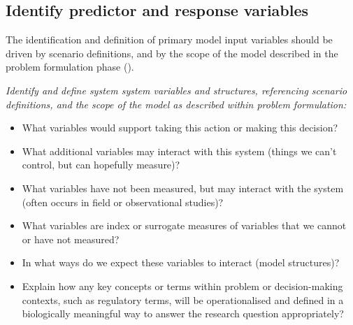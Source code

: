 \documentclass[
]{article}
\providecommand{\tightlist}{%
  \setlength{\itemsep}{0pt}\setlength{\parskip}{0pt}}
\begin{document}
\subsection{Identify predictor and response
variables}\label{identify-predictor-and-response-variables}

\begin{tcolorbox}[enhanced jigsaw, opacitybacktitle=0.6, bottomrule=.15mm, leftrule=.75mm, rightrule=.15mm, colbacktitle=quarto-callout-note-color!10!white, toprule=.15mm, titlerule=0mm, left=2mm, colframe=quarto-callout-note-color-frame, breakable, title=\textcolor{quarto-callout-note-color}{\faInfo}\hspace{0.5em}{Explanation}, opacityback=0, coltitle=black, bottomtitle=1mm, colback=white, toptitle=1mm, arc=.35mm]

The identification and definition of primary model input variables
should be driven by scenario definitions, and by the scope of the model
described in the problem formulation phase
().

\end{tcolorbox}

\begin{tcolorbox}[enhanced jigsaw, opacitybacktitle=0.6, bottomrule=.15mm, leftrule=.75mm, rightrule=.15mm, colbacktitle=quarto-callout-caution-color!10!white, toprule=.15mm, titlerule=0mm, left=2mm, colframe=quarto-callout-caution-color-frame, breakable, title=\textcolor{quarto-callout-caution-color}{\faFire}\hspace{0.5em}{Preregistration Item}, opacityback=0, coltitle=black, bottomtitle=1mm, colback=white, toptitle=1mm, arc=.35mm]

\emph{Identify and define system system variables and structures,
referencing scenario definitions, and the scope of the model as
described within problem formulation:}

\begin{itemize}
\tightlist
\item[$\square$]
  What variables would support taking this action or making this
  decision?
\item[$\square$]
  What additional variables may interact with this system (things we
  can't control, but can hopefully measure)?
\item[$\square$]
  What variables have not been measured, but may interact with the
  system (often occurs in field or observational studies)?
\item[$\square$]
  What variables are index or surrogate measures of variables that we
  cannot or have not measured?
\item[$\square$]
  In what ways do we expect these variables to interact (model
  structures)?
\item[$\square$]
  Explain how any key concepts or terms within problem or
  decision-making contexts, such as regulatory terms, will be
  operationalised and defined in a biologically meaningful way to answer
  the research question appropriately?
\end{itemize}

\end{tcolorbox}
\end{document}
